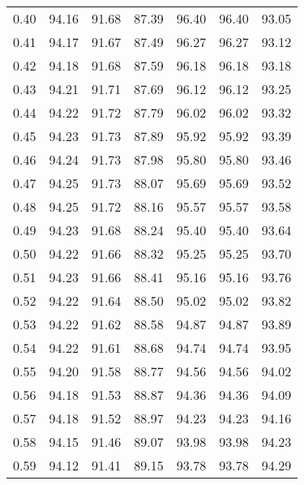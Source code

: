 \begin{tabular}{|c|c|c|c|c|c|c|}
      0.40 &     94.16 &     91.68 &      87.39 &   96.40 &      96.40 &         93.05 \\
      0.41 &     94.17 &     91.67 &      87.49 &   96.27 &      96.27 &         93.12 \\
      0.42 &     94.18 &     91.68 &      87.59 &   96.18 &      96.18 &         93.18 \\
      0.43 &     94.21 &     91.71 &      87.69 &   96.12 &      96.12 &         93.25 \\
      0.44 &     94.22 &     91.72 &      87.79 &   96.02 &      96.02 &         93.32 \\
      0.45 &     94.23 &     91.73 &      87.89 &   95.92 &      95.92 &         93.39 \\
      0.46 &     94.24 &     91.73 &      87.98 &   95.80 &      95.80 &         93.46 \\
      0.47 &     94.25 &     91.73 &      88.07 &   95.69 &      95.69 &         93.52 \\
      0.48 &     94.25 &     91.72 &      88.16 &   95.57 &      95.57 &         93.58 \\
      0.49 &     94.23 &     91.68 &      88.24 &   95.40 &      95.40 &         93.64 \\
      0.50 &     94.22 &     91.66 &      88.32 &   95.25 &      95.25 &         93.70 \\
      0.51 &     94.23 &     91.66 &      88.41 &   95.16 &      95.16 &         93.76 \\
      0.52 &     94.22 &     91.64 &      88.50 &   95.02 &      95.02 &         93.82 \\
      0.53 &     94.22 &     91.62 &      88.58 &   94.87 &      94.87 &         93.89 \\
      0.54 &     94.22 &     91.61 &      88.68 &   94.74 &      94.74 &         93.95 \\
      0.55 &     94.20 &     91.58 &      88.77 &   94.56 &      94.56 &         94.02 \\
      0.56 &     94.18 &     91.53 &      88.87 &   94.36 &      94.36 &         94.09 \\
      0.57 &     94.18 &     91.52 &      88.97 &   94.23 &      94.23 &         94.16 \\
      0.58 &     94.15 &     91.46 &      89.07 &   93.98 &      93.98 &         94.23 \\
      0.59 &     94.12 &     91.41 &      89.15 &   93.78 &      93.78 &         94.29 \\

\end{tabular}
